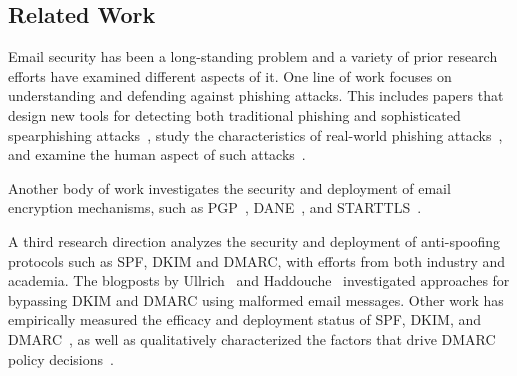 \subsection{Related Work}

Email security has been a long-standing problem and a variety of prior research efforts have examined different aspects of it. One line of work focuses on understanding and defending against phishing attacks. This includes papers that design new tools for detecting both traditional phishing and sophisticated spearphishing attacks~\cite{abu2007comparison,bergholz2008improved, fette2007learning, garera2007framework, whittaker2010large, duman2016emailprofiler, khonji2011mitigation, zhao2016optimizing, stringhini2015ain, ho19, ho17, cidon19},
study the characteristics of real-world phishing attacks~\cite{han2016phisheye,onaolapo2016happens,thomas2014consequences,bursztein2014handcrafted}, and examine the human aspect of such attacks~\cite{lastdrager2017effective, reinheimer2020investigation,abu2007comparison,
mayer2022don,caputo2013going,
Spero20, Sheng10, Kumaraguru10}.

Another body of work investigates the security and deployment of email encryption mechanisms, such as PGP~\cite{muller2019johnny, poddebniak2018efail, schwenk2020mitigation, muller2020mailto,stransky202227}, DANE~\cite{lee2022under,lee2020longitudinal}, and STARTTLS~\cite{zakir15,Foster15,poddebniak2021tls,holz2015tls,mayer2016no}.

A third research direction analyzes the security and deployment of anti-spoofing protocols such as SPF, DKIM and DMARC, with efforts from both industry and academia. The blogposts by Ullrich~\cite{Breaking12:online} and Haddouche~\cite{Mailsplo10:online} investigated approaches for bypassing DKIM and DMARC using malformed email messages.
Other work has empirically measured the efficacy and deployment status of SPF, DKIM, and DMARC~\cite{hu_end--end_nodate, zakir15, Foster15, tatang2021evolution, deccio21, wang2022large, bennett2022spfail}, as well as qualitatively characterized the factors that drive DMARC policy decisions~\cite{hutowardsunderstanding}.


